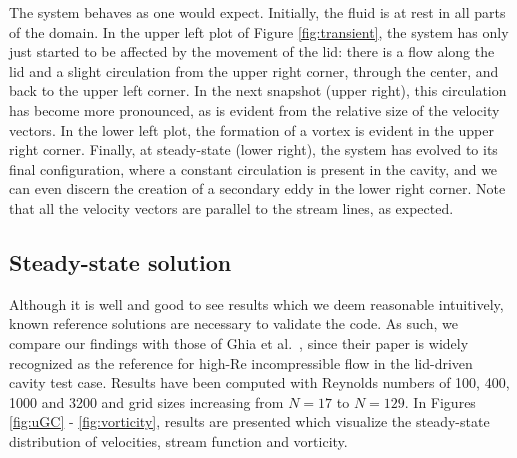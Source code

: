\documentclass[final,3p,twocolumn]{elsarticle}
\begin{document}
The system behaves as one would expect. Initially, the fluid is at rest in all
parts of the domain. In the upper left plot of Figure \ref{fig:transient}, the
system has only just started to be affected by the movement of the lid: there
is a flow along the lid and a slight circulation from the upper right corner,
through the center, and back to the upper left corner. In the next snapshot
(upper right), this circulation has become more pronounced, as is evident from
the relative size of the velocity vectors. In the lower left plot, the
formation of a vortex is evident in the upper right corner. Finally, at
steady-state (lower right), the system has evolved to its final configuration,
where a constant circulation is present in the cavity, and we can even discern
the creation of a secondary eddy in the lower right corner. Note that all the
velocity vectors are parallel to the stream lines, as expected. 

\subsection{Steady-state solution}
\label{subsec:steady}

Although it is well and good to see results which we deem reasonable
intuitively, known reference solutions are necessary to validate the code. As
such, we compare our findings with those of Ghia et al.\ \cite{ghia1982high},
since their paper is widely recognized as the reference for high-Re
incompressible flow in the lid-driven cavity test case. Results have been
computed with Reynolds numbers of 100, 400, 1000 and 3200 and grid sizes
increasing from $N=17$ to $N=129$. In Figures \ref{fig:uGC} -
\ref{fig:vorticity}, results are presented which visualize the steady-state
distribution of velocities, stream function and vorticity. 
\end{document}
